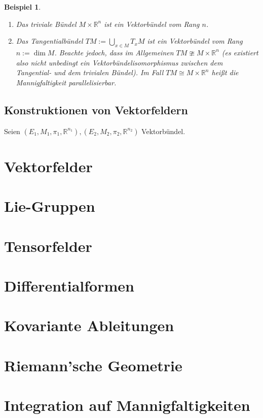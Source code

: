 \documentclass[a4paper]{scrreprt}
\numberwithin{equation}{chapter}
\newcommand{\R}{\mathds{R}}
\theoremstyle{plain}
\newtheorem{bsp}[defn]{Beispiel}
\begin{document}
		\begin{bsp}\hfill
			\begin{enumerate}
				\item Das triviale Bündel $M\times \R^n$ ist ein Vektorbündel vom Rang $n$.
				\item Das Tangentialbündel $TM:=\bigcup_{x\in M}T_xM$ ist ein Vektorbündel vom Rang $n:=\dim M$. Beachte jedoch, dass im Allgemeinen $TM\ncong M\times \R^n$ (es existiert also nicht unbedingt ein Vektorbündelisomorphismus zwischen dem Tangential- und dem trivialen Bündel). Im Fall $TM\cong M\times \R^n$ heißt die Mannigfaltigkeit parallelisierbar.
			\end{enumerate}
		\end{bsp}
	\section{Konstruktionen von Vektorfeldern}
		Seien $(E_1,M_1,\pi_1,\R^{n_1}),(E_2,M_2,\pi_2,\R^{n_2})$ Vektorbündel.
		
\chapter{Vektorfelder}


\chapter{Lie-Gruppen}


\chapter{Tensorfelder}


\chapter{Differentialformen}


\chapter{Kovariante Ableitungen}


\chapter{Riemann'sche Geometrie}


\chapter{Integration auf Mannigfaltigkeiten}
\end{document}
